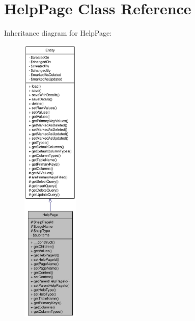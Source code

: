 \hypertarget{classHelpPage}{
\section{HelpPage Class Reference}
\label{classHelpPage}
}


Inheritance diagram for HelpPage:\nopagebreak
\begin{figure}[H]
\begin{center}
\leavevmode
\includegraphics[height=400pt]{classHelpPage__inherit__graph}
\end{center}
\end{figure}


